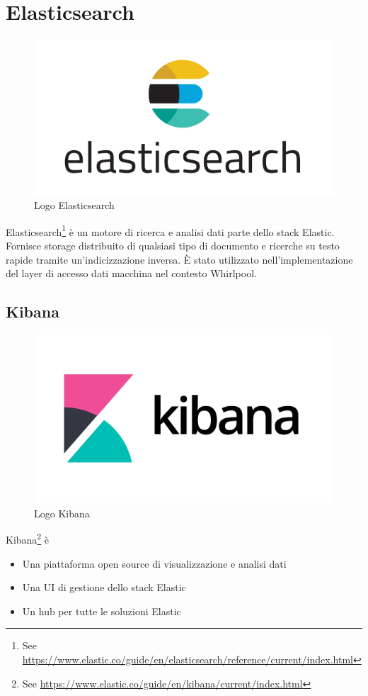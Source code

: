 \FloatBarrier
\section{Elasticsearch}
\begin{figure}[h!]
\centering
\includegraphics[scale=0.05]{images/esearch.png}
\caption{Logo Elasticsearch}
\end{figure}
Elasticsearch\footnote{See \url{https://www.elastic.co/guide/en/elasticsearch/reference/current/index.html}} è un motore di ricerca e analisi dati parte dello stack Elastic. Fornisce storage distribuito di qualsiasi tipo di documento e ricerche su testo rapide tramite un'indicizzazione inversa.
È stato utilizzato nell'implementazione del layer di accesso dati macchina nel contesto Whirlpool.
\FloatBarrier
\subsection{Kibana}
\begin{figure}[h!]
\centering
\includegraphics[scale=0.13]{images/kibana.png}
\caption{Logo Kibana}
\end{figure}
Kibana\footnote{See \url{https://www.elastic.co/guide/en/kibana/current/index.html}} è \begin{itemize}
\item
Una piattaforma open source di visualizzazione e analisi dati
\item
Una UI di gestione dello stack Elastic
\item
Un hub per tutte le soluzioni Elastic \cite{KIBANA}
\end{itemize}


